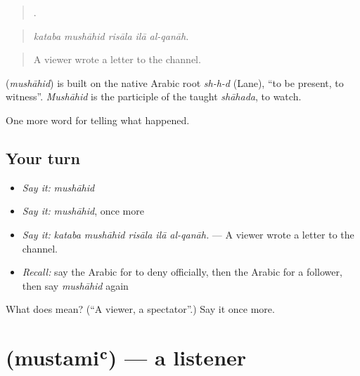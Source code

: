 \begin{quote}
    .
\end{quote}

\begin{quote}
\emph{kataba mushāhid risāla ilā al-qanāh.}
\end{quote}

\begin{quote}
A viewer wrote a letter to the channel.
\end{quote}

\begin{cousinweb}
\textbf{} (\emph{mushāhid}) is built on the native Arabic root \emph{sh-h-d} (Lane), \textquotedblleft{}to be present, to witness\textquotedblright{}. \emph{Mushāhid} is the participle of the taught \emph{shāhada}, to watch.
\end{cousinweb}

\begin{grammarlens}[title={What you've built}]
One more word for telling what happened.
\end{grammarlens}

\subsection*{Your turn}
\begin{itemize}
\raggedright
  \item \emph{Say it:} \emph{mushāhid}
  \item \emph{Say it:} \emph{mushāhid}, once more
  \item \emph{Say it:} \emph{kataba mushāhid risāla ilā al-qanāh.} — A viewer wrote a letter to the channel.
  \item \emph{Recall:} say the Arabic for to deny officially, then the Arabic for a follower, then say \emph{mushāhid} again
\end{itemize}

\begin{tcolorbox}[breakable,colback=teal!4,colframe=teal!35!black,title={Before you move on}]
What does  mean? (\textquotedblleft{}A viewer, a spectator\textquotedblright{}.) Say it once more.
\end{tcolorbox}
\section[\texorpdfstring{\ar{مستمع} (mustamiʿ)}{مستمع (mustamiʿ)}]{ (mustamiʿ) — a listener}

